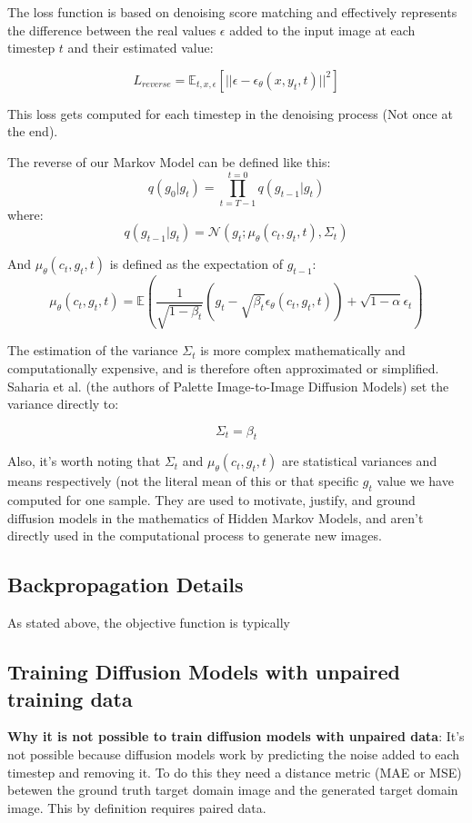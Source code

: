 \documentclass[12pt]{article}
\begin{document}
The loss function is based on denoising score matching and effectively represents the difference between the real values \(\epsilon\) added to the input image at each timestep \(t\) and their estimated value:

\[L_{reverse} = \mathbb{E}_{t,x,\epsilon}\left[ || \epsilon - \epsilon_\theta(x,y_t, t) ||^2 \right]\]

This loss gets computed for each timestep in the denoising process (Not once at the end).


The reverse of our Markov Model can be defined like this: 
\[q(g_0 | g_{t}) = \prod_{t=T-1}^{t=0}q(g_{t-1} | g_t)\]
where:
\[q(g_{t-1} | g_t) = \mathcal{N}(g_t; \mu_\theta(c_t, g_t,t), \Sigma_t)\]

And \(\mu_\theta(c_t, g_t,t)\) is defined as the expectation of \(g_{t-1}\):
\[\mu_\theta(c_t, g_t,t) = \mathbb{E}\left(\frac{1}{\sqrt{1 - \beta_t}}\left(g_t - \sqrt{\beta_t}\epsilon_\theta(c_t, g_t, t) \right) + \sqrt{1-\alpha}\epsilon_t \right)\]

The estimation of the variance \(\Sigma_t\) is more complex mathematically and computationally expensive, and is therefore often approximated or simplified. Saharia et al. (the authors of Palette Image-to-Image Diffusion Models) set the variance directly to:

\[\Sigma_t = \beta_t\]

Also, it's worth noting that \(\Sigma_t\) and \(\mu_\theta(c_t, g_t,t)\) are statistical variances and means respectively (not the literal mean of this or that specific \(g_t\) value we have computed for one sample. They are used to motivate, justify, and ground diffusion models in the mathematics of Hidden Markov Models, and aren't directly used in the computational process to generate new images.

\subsection{Backpropagation Details}
As stated above, the objective function is typically 
\subsection{Training Diffusion Models with unpaired training data}
\textbf{Why it is not possible to train diffusion models with unpaired data}: It's not possible because diffusion  models work by predicting the noise added to each timestep and removing it. To do this they need a distance metric (MAE or MSE) betewen the ground truth target domain image and the generated target domain image. This by definition requires paired data. \\
\end{document}
